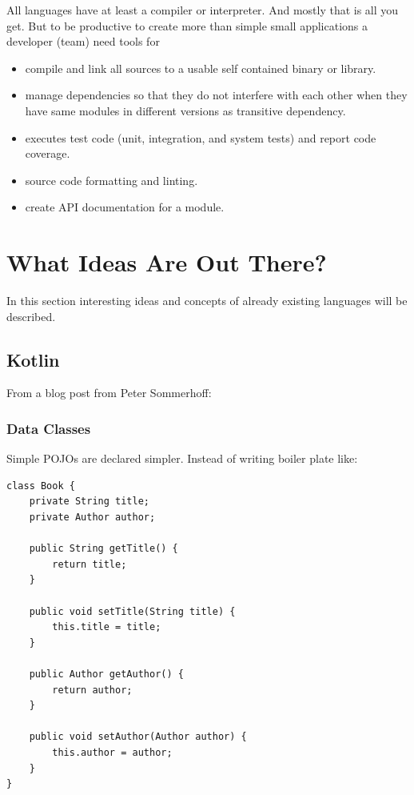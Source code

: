 \documentclass[11pt, a4paper]{report}
\begin{document}
All languages have at least a compiler or interpreter. And mostly that is all you get. But to be productive to create more than simple small applications a developer (team) need tools for

\begin{itemize}
    \item compile and link all sources to a usable self contained binary or library.
    \item manage dependencies so that they do not interfere with each other when they have same modules in different versions as transitive dependency.
    \item executes test code (unit, integration, and system tests) and report code coverage.
    \item source code formatting and linting.
    \item create API documentation for a module.
\end{itemize}

\chapter{What Ideas Are Out There?}

In this section interesting ideas and concepts of already existing languages will be described.

\section{Kotlin}

From a blog post from Peter Sommerhoff\cite{kotlin-sommerhoff}:

\subsection{Data Classes}

Simple POJOs are declared simpler. Instead of writing boiler plate like:

\begin{lstlisting}
class Book {
    private String title;
    private Author author;

    public String getTitle() {
        return title;
    }
    
    public void setTitle(String title) {
        this.title = title;
    }

    public Author getAuthor() {
        return author;
    }
    
    public void setAuthor(Author author) {
        this.author = author;
    }
}
\end{lstlisting}
\end{document}
